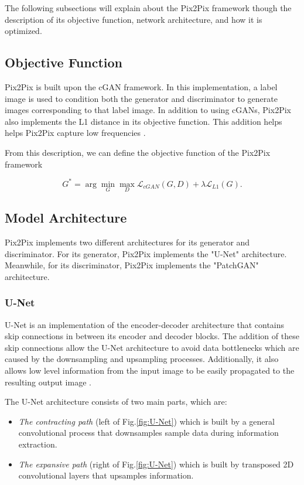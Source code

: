 \documentclass[peerreview]{IEEEtran}
\begin{document}
The following subsections will explain about the Pix2Pix framework though the description of its objective function, network architecture, and how it is optimized.  

\subsection{Objective Function}
Pix2Pix is built upon the cGAN framework. In this implementation, a label image is used to condition both the generator and discriminator to generate images corresponding to that label image. In addition to using cGANs, Pix2Pix also implements the L1 distance in its objective function. This addition helps helps Pix2Pix capture low frequencies \cite{isola2017image}.

From this description, we can define the objective function of the Pix2Pix framework 

\begin{equation}\label{eq:Pix2Pix}
G^{*} = \arg \min_{G} \max_{D} \mathcal{L}_{cGAN}(G, D) + \lambda\mathcal{L}_{L1}(G).
\end{equation}

\subsection{Model Architecture}
Pix2Pix implements two different architectures for its generator and discriminator. For its generator, Pix2Pix implements the "U-Net" architecture. Meanwhile, for its discriminator, Pix2Pix implements the "PatchGAN" architecture.

\subsubsection{U-Net}
U-Net is an implementation of the encoder-decoder architecture that contains skip connections in between its encoder and decoder blocks. The addition of these skip connections allow the U-Net architecture to avoid data bottlenecks which are caused by the downsampling and upsampling processes. Additionally, it also allows low level information from the input image to be easily propagated to the resulting output image \cite{isola2017image}.

The U-Net architecture consists of two main parts, which are:

\begin{itemize}
    \item \emph{The contracting path} (left of Fig.\ref{fig:U-Net}) which is built by a general convolutional process that downsamples sample data during information extraction.
    \item \emph{The expansive path} (right of Fig.\ref{fig:U-Net}) which is built by transposed 2D convolutional layers that upsamples information. 
\end{itemize}
\end{document}
